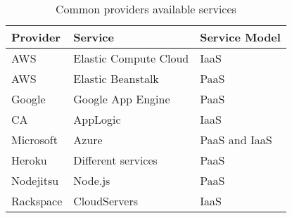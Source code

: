 \begin{table}
  \begin{center}
    \begin{tabular}{ | l | l | l | }
      \hline
      \textbf{Provider} & \textbf{Service} & \textbf{Service Model} \\ \hline
      AWS & Elastic Compute Cloud & IaaS \\ \hline
      AWS & Elastic Beanstalk & PaaS \\ \hline
      Google & Google App Engine & PaaS \\ \hline
      CA & AppLogic & IaaS \\ \hline
      Microsoft & Azure & PaaS and IaaS \\ \hline
      Heroku & Different services & PaaS \\ \hline
      Nodejitsu & Node.js & PaaS \\ \hline
      Rackspace & CloudServers & IaaS \\ \hline
    \end{tabular}
  \end{center}
  \caption{Common providers available services}
  \label{table:providerservices}
\end{table}

